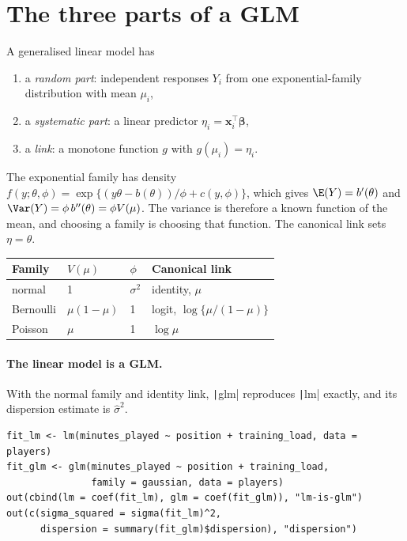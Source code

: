 \documentclass[12pt,notitlepage]{report}
\begin{document}
\section{The three parts of a GLM}

A generalised linear model has
\begin{enumerate}
  \item a \emph{random part}: independent responses $Y_i$ from one
    exponential-family distribution with mean $\mu_i$,
  \item a \emph{systematic part}: a linear predictor
    $\eta_i = \bm{x}_i^\top \bm{\beta}$,
  \item a \emph{link}: a monotone function $g$ with $g(\mu_i) = \eta_i$.
\end{enumerate}
The exponential family has density
$f(y; \theta, \phi) = \exp\{(y\theta - b(\theta))/\phi + c(y, \phi)\}$, which
gives $\E(Y) = b'(\theta)$ and $\Var(Y) = \phi\, b''(\theta) = \phi V(\mu)$.
The variance is therefore a known function of the mean, and choosing a family
is choosing that function. The canonical link sets $\eta = \theta$.

\begin{center}
  \begin{tabular}{llll}
    \toprule
    Family & $V(\mu)$ & $\phi$ & Canonical link \\
    \midrule
    normal & 1 & $\sigma^2$ & identity, $\mu$ \\
    Bernoulli & $\mu(1 - \mu)$ & 1 & logit, $\log\{\mu/(1 - \mu)\}$ \\
    Poisson & $\mu$ & 1 & $\log \mu$ \\
    \bottomrule
  \end{tabular}
\end{center}

\paragraph{The linear model is a GLM.}
With the normal family and identity link, \texttt|glm| reproduces
\texttt|lm| exactly, and its dispersion estimate is $\hat\sigma^2$.

\begin{verbatim}
fit_lm <- lm(minutes_played ~ position + training_load, data = players)
fit_glm <- glm(minutes_played ~ position + training_load,
               family = gaussian, data = players)
out(cbind(lm = coef(fit_lm), glm = coef(fit_glm)), "lm-is-glm")
out(c(sigma_squared = sigma(fit_lm)^2,
      dispersion = summary(fit_glm)$dispersion), "dispersion")
\end{verbatim}
\end{document}
